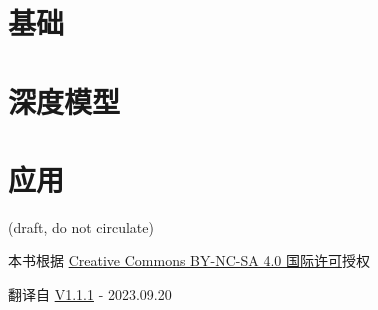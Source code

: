 \documentclass[oneside,11pt]{memoir}
\begin{document}




\part{基础}






\part{深度模型}





\part{应用}










\printindex
{}


\newpage


\ifdefined\draft
\begin{center}
  {\color{red} (draft, do not circulate)}
\end{center}
\else
本书根据
\href{https://creativecommons.org/licenses/by-nc-sa/4.0/}{Creative
  Commons BY-NC-SA 4.0 国际许可}授权
\fi

\begin{center}
    翻译自 \href{https://fleuret.org/public/lbdl.pdf}{V1.1.1} - 2023.09.20
\end{center}



\checknbdrafts
\end{document}
